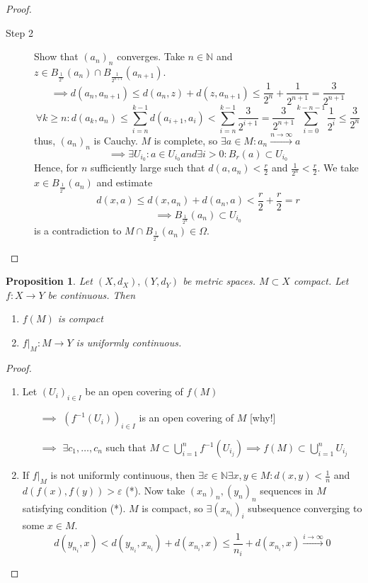 \documentclass[a4paper]{article}
\newcounter{lecref}[section]
\numberwithin{lecref}{section}
\newtheorem{proposition}[lecref]{Proposition}
\begin{document}
\begin{proof}
\begin{description}
\begin{description}
				\item[Step 2] Show that $(a_n)_n$ converges. Take $n \in \mathbb N$ and $z \in B_{\frac{1}{2^n}}(a_n) \cap B_{\frac{1}{2^{n+1}}}(a_{n+1})$.
					\[ \implies d(a_n, a_{n+1}) \leq d(a_n, z) + d(z, a_{n+1}) \leq \frac{1}{2^n} + \frac{1}{2^{n+1}} = \frac{3}{2^{n+1}} \]
					\[ \forall k \geq n: d(a_k, a_n) \leq \sum_{i=n}^{k-1} d(a_{i+1}, a_i) < \sum_{i=n}^{k-1} \frac{3}{2^{i+1}} = \frac{3}{2^{n+1}} \sum_{i=0}^{k-n-1} \frac{1}{2^i} \leq \frac{3}{2^n} \]
					thus, $(a_n)_n$ is Cauchy. $M$ is complete, so $\exists a \in M: a_n \xrightarrow{n \to \infty} a$
					\[ \implies \exists U_{i_0}: a \in U_{i_0} and \exists i > 0: B_r(a) \subset U_{i_0} \]
					Hence, for $n$ sufficiently large such that $d(a, a_n) < \frac r2$ and $\frac1{2^n} < \frac r2$.
					We take $x \in B_{\frac1{2^n}}(a_n)$ and estimate 
					\[ d(x, a) \leq d(x, a_n) + d(a_n, a) < \frac r2 + \frac r2 = r \]
					\[ \implies B_{\frac{1}{2^n}}(a_n) \subset U_{i_0} \]
					is a contradiction to $M \cap B_{\frac1{2^n}}(a_n) \in \Omega$.
			\end{description}
	\end{description}
\end{proof}

\begin{proposition}
	\label{proposition:1.20}
	Let $(X, d_X), (Y, d_Y)$ be metric spaces. $M \subset X$ compact. Let $f: X \to Y$ be continuous. Then
	\begin{enumerate}
		\item $f(M)$ is compact
		\item $f|_M: M \to Y$ is uniformly continuous.
	\end{enumerate}
\end{proposition}

\begin{proof}
	\begin{enumerate}
		\item Let $(U_i)_{i \in I}$ be an open covering of $f(M)$
			\begin{enumerate}
				\item[$\implies$] $(f^{-1}(U_i))_{i \in I}$ is an open covering of $M$ [why!]
				\item[$\implies$] $\exists c_1, \dots, c_n$ such that $M \subset \bigcup_{i=1}^n f^{-1}(U_{i_j}) \implies f(M) \subset \bigcup_{i=1}^n U_{i_j}$
			\end{enumerate}
		\item If $f|_M$ is not uniformly continuous, then $\exists \varepsilon \in \mathbb N \exists x, y \in M: d(x, y) < \frac1n$ and $d(f(x), f(y)) > \varepsilon$ (*).
			Now take $(x_n)_n, (y_n)_n$ sequences in $M$ satisfying condition (*).
			$M$ is compact, so $\exists (x_{n_i})_{i}$ subsequence converging to some $x \in M$.
			\[ d(y_{n_i}, x) < d(y_{n_i}, x_{n_i}) + d(x_{n_i}, x) \leq \frac{1}{n_i} + d(x_{n_i}, x) \xrightarrow{i \to \infty} 0 \]
	\end{enumerate}
\end{proof}
\end{document}
